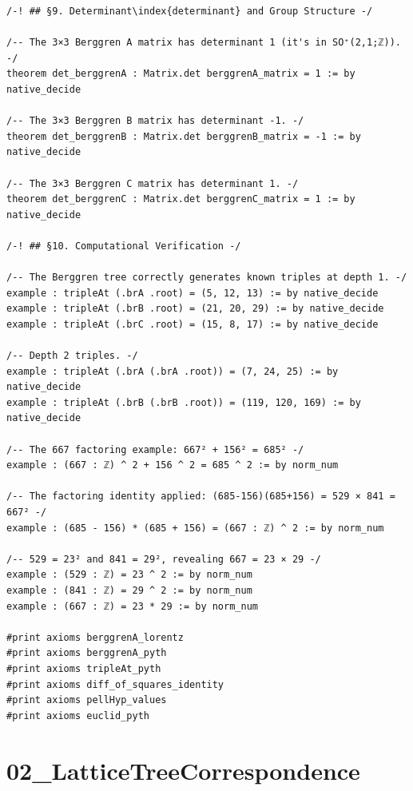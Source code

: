 \documentclass[11pt,openany]{book}
\theoremstyle{definition}
\theoremstyle{plain}
\theoremstyle{remark}
\begin{document}
\begin{lstlisting}[style=lean]
/-! ## §9. Determinant\index{determinant} and Group Structure -/

/-- The 3×3 Berggren A matrix has determinant 1 (it's in SO⁺(2,1;ℤ)). -/
theorem det_berggrenA : Matrix.det berggrenA_matrix = 1 := by native_decide

/-- The 3×3 Berggren B matrix has determinant -1. -/
theorem det_berggrenB : Matrix.det berggrenB_matrix = -1 := by native_decide

/-- The 3×3 Berggren C matrix has determinant 1. -/
theorem det_berggrenC : Matrix.det berggrenC_matrix = 1 := by native_decide

/-! ## §10. Computational Verification -/

/-- The Berggren tree correctly generates known triples at depth 1. -/
example : tripleAt (.brA .root) = (5, 12, 13) := by native_decide
example : tripleAt (.brB .root) = (21, 20, 29) := by native_decide
example : tripleAt (.brC .root) = (15, 8, 17) := by native_decide

/-- Depth 2 triples. -/
example : tripleAt (.brA (.brA .root)) = (7, 24, 25) := by native_decide
example : tripleAt (.brB (.brB .root)) = (119, 120, 169) := by native_decide

/-- The 667 factoring example: 667² + 156² = 685² -/
example : (667 : ℤ) ^ 2 + 156 ^ 2 = 685 ^ 2 := by norm_num

/-- The factoring identity applied: (685-156)(685+156) = 529 × 841 = 667² -/
example : (685 - 156) * (685 + 156) = (667 : ℤ) ^ 2 := by norm_num

/-- 529 = 23² and 841 = 29², revealing 667 = 23 × 29 -/
example : (529 : ℤ) = 23 ^ 2 := by norm_num
example : (841 : ℤ) = 29 ^ 2 := by norm_num
example : (667 : ℤ) = 23 * 29 := by norm_num

#print axioms berggrenA_lorentz
#print axioms berggrenA_pyth
#print axioms tripleAt_pyth
#print axioms diff_of_squares_identity
#print axioms pellHyp_values
#print axioms euclid_pyth

\end{lstlisting}

\clearpage

\section*{02\_LatticeTreeCorrespondence}
\end{document}
